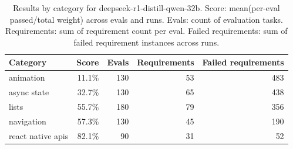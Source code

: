 \begin{table}[htbp]
\centering
\begin{tabular}{lrrrr}
\toprule
Category & Score & Evals & Requirements & Failed requirements \\
\midrule
animation & 11.1\% & 130 & 53 & 483 \\
async state & 32.7\% & 130 & 65 & 438 \\
lists & 55.7\% & 180 & 79 & 356 \\
navigation & 57.3\% & 130 & 45 & 190 \\
react native apis & 82.1\% & 90 & 31 & 52 \\
\bottomrule
\end{tabular}
\caption{Results by category for deepseek-r1-distill-qwen-32b. Score: mean(per-eval passed/total weight) across evals and runs. Evals: count of evaluation tasks. Requirements: sum of requirement count per eval. Failed requirements: sum of failed requirement instances across runs.}
\end{table}
